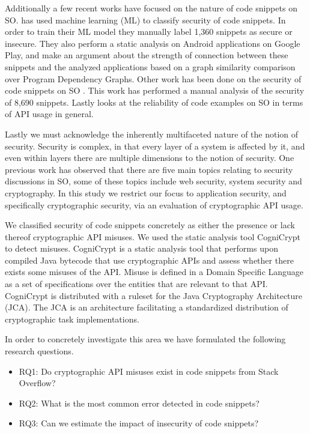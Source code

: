 \documentclass[10pt, conference]{IEEEtran}
\begin{document}
Additionally a few recent works have focused on the nature of code snippets on SO. \cite{7958574} has used machine learning (ML) to classify security of code snippets. In order to train their ML model they manually label 1,360 snippets as secure or insecure. They also perform a static analysis on Android applications on Google Play, and make an argument about the strength of connection between these snippets and the analyzed applications based on a graph similarity comparison over Program Dependency Graphs. Other work has been done on the security of code snippets on SO \cite{DBLP:journals/corr/abs-1901-01327}. This work has performed a manual analysis of the security of 8,690 snippets. Lastly \cite{Zhang:2018:CEO:3180155.3180260} looks at the reliability of code examples on SO in terms of API usage in general.
 
 
Lastly we must acknowledge the inherently multifaceted nature of the notion of security. Security is complex, in that every layer of a system is affected by it, and even within layers there are multiple dimensions to the notion of security. One previous work \cite{Yang2016} has observed that there are five main topics relating to security discussions in SO, some of these topics include web security, system security and cryptography. In this study we restrict our focus to application security, and specifically cryptographic security, via an evaluation of cryptographic API usage.

We classified security of code snippets concretely as either the presence or lack thereof cryptographic API misuses. We used the static analysis tool CogniCrypt \cite{krger_et_al:LIPIcs:2018:9215} to detect misuses. CogniCrypt is a static analysis tool that performs upon compiled Java bytecode that use cryptographic APIs and assess whether there exists some misuses of the API. Misuse is defined in a Domain Specific Language as a set of specifications over the entities that are relevant to that API. CogniCrypt is distributed with a ruleset for the Java Cryptography Architecture (JCA). The JCA is an architecture facilitating a standardized distribution of cryptographic task implementations.

In order to concretely investigate this area we have formulated the following research questions.

\begin{itemize}
\item  RQ1: Do cryptographic API misuses exist in code snippets from Stack Overflow?

\item  RQ2: What is the most common error detected in code snippets?

\item  RQ3: Can we estimate the impact of insecurity of code snippets?

\end{itemize}
\end{document}
